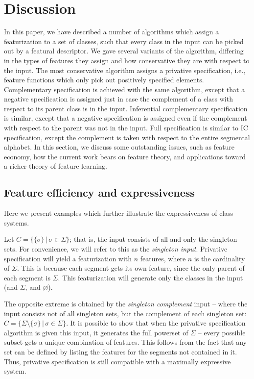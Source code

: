 \documentclass[12pt, oneside]{article}   	%
\begin{document}
\FloatBarrier
\section{Discussion}
\label{sec:discussion}

In this paper, we have described a number of algorithms which assign a featurization to a set of classes, such that every class in the input can be picked out by a featural descriptor. We gave several variants of the algorithm, differing in the types of features they assign and how conservative they are with respect to the input. The most conservative algorithm assigns a privative specification, i.e., feature functions which only pick out positively specified elements. Complementary specification is achieved with the same algorithm, except that a negative specification is assigned just in case the complement of a class with respect to its parent class is in the input. Inferential complementary specification is similar, except that a negative specification is assigned even if the complement with respect to the parent was not in the input. Full specification is similar to IC specification, except the complement is taken with respect to the entire segmental alphabet. In this section, we discuss some outstanding issues, such as feature economy, how the current work bears on feature theory, and applications toward a richer theory of feature learning.

\subsection{Feature efficiency and expressiveness}

Here we present examples which further illustrate the expressiveness of class systems.

Let $C = \{ \{\sigma\} \, | \, \sigma \in \Sigma \}$; that is, the input consists of all and only the singleton sets. For convenience, we will refer to this as the \textit{singleton input}. Privative specification will yield a featurization with $n$ features, where $n$ is the cardinality of $\Sigma$. This is because each segment gets its own feature, since the only parent of each segment is $\Sigma$. This featurization will generate only the classes in the input (and $\Sigma$, and $\varnothing$).

The opposite extreme is obtained by the \textit{singleton complement} input -- where the input consists not of all singleton sets, but the complement of each singleton set:  $C = \{ \Sigma \setminus \{\sigma\} \, | \, \sigma \in \Sigma \}$. It is possible to show that when the privative specification algorithm is given this input, it generates the full powerset of $\Sigma$ -- every possible subset gets a unique combination of features. This follows from the fact that any set can be defined by listing the features for the segments not contained in it. Thus, privative specification is still compatible with a maximally expressive system.
\end{document}
